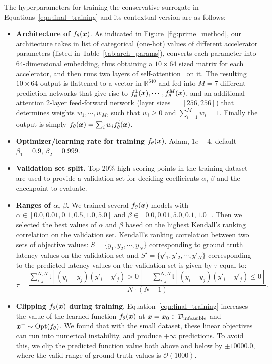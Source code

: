 The hyperparameters for training the conservative surrogate in Equations~\ref{eqn:final_training} and its contextual version are as follows:
\begin{itemize}
    \item \textbf{Architecture of ${f}_\theta({\boldsymbol{x}})$}. As indicated in Figure~\ref{fig:prime_method}, our architecture takes in list of categorical (one-hot) values of different accelerator parameters (listed in Table~\ref{tab:arch_params}), converts each parameter into $64$-dimensional embedding, thus obtaining a $10 \times 64$ sized matrix for each accelerator, and then runs two layers of self-attention~\citep{vaswani2017attention} on it. The resulting $10 \times 64$ output is flattened to a vector in $\mathbb{R}^{640}$ and fed into $M = 7$ different prediction networks that give rise to $f^1_\theta({\boldsymbol{x}}), \cdots, f^M_\theta({\boldsymbol{x}})$, and an additional attention 2-layer feed-forward network (layer sizes $=[256, 256]$) that determines weights $w_1, \cdots, w_M$, such that $w_i \geq 0$ and $\sum_{i=1}^M w_i = 1$. Finally the output is simply $f_\theta({\boldsymbol{x}}) = \sum_i w_i f^i_\theta({\boldsymbol{x}})$. 
    \item \textbf{Optimizer/learning rate for training $f_\theta({\boldsymbol{x}})$}. Adam, $1e-4$, default $\beta_1 = 0.9$, $\beta_2 = 0.999$.
    \item \textbf{Validation set split.} Top 20\% high scoring points in the training dataset are used to provide a validation set for deciding coefficients $\alpha$, $\beta$ and the checkpoint to evaluate.
    \item \textbf{Ranges of $\alpha$, $\beta$.} We trained several $f_\theta({\boldsymbol{x}})$ models with $\alpha \in [0.0, 0.01, 0.1, 0.5, 1.0, 5.0]$ and $\beta \in [0.0, 0.01, 5.0, 0.1, 1.0]$. Then we selected the best values of $\alpha$ and $\beta$ based on the highest Kendall's ranking correlation on the validation set. Kendall's ranking correlation between two sets of objective values: $S = \{y_1, y_2, \cdots, y_N\}$ corresponding to ground truth latency values on the validation set and $S' = \{y'_1, y'_2, \cdots, y'_N \}$ corresponding to the predicted latency values on the validation set is given by $\tau$ equal to:
    \begin{equation}
        \tau = \frac{\sum_{i, j}^{N, N} \mathbb{I}[(y_i - y_j) (y'_i - y'_j) > 0] - \sum_{i, j}^{N, N} \mathbb{I}[(y_i - y_j) (y'_i - y'_j) \leq 0]}{N \cdot (N - 1)}.   
    \end{equation}
    \item \textbf{Clipping $f_\theta({\boldsymbol{x}})$ during training}. Equation~\ref{eqn:final_training} increases the value of the learned function $f_\theta({\boldsymbol{x}})$ at ${\boldsymbol{x}} = {\boldsymbol{x}}_0 \in \mathcal{D}_\text{infeasible}$ and ${\boldsymbol{x}}^- \sim \mathrm{Opt}(f_\theta)$. We found that with the small dataset, these linear objectives can run into numerical instability, and produce $+\infty$ predictions. To avoid this, we clip the predicted function value both above and below by $\pm 10000.0$, where the valid range of ground-truth values is $\mathcal{O}(1000)$.

\end{itemize}
